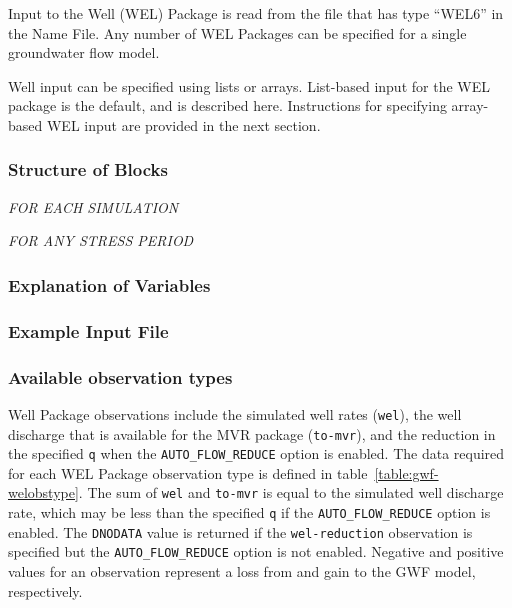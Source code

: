 Input to the Well (WEL) Package is read from the file that has type ``WEL6'' in the Name File.  Any number of WEL Packages can be specified for a single groundwater flow model.

Well input can be specified using lists or arrays.  List-based input for the WEL package is the default, and is described here.  Instructions for specifying array-based WEL input are provided in the next section.

\vspace{5mm}
\subsubsection{Structure of Blocks}
\vspace{5mm}

\noindent \textit{FOR EACH SIMULATION}


\vspace{5mm}
\noindent \textit{FOR ANY STRESS PERIOD}

\packageperioddescription

\vspace{5mm}
\subsubsection{Explanation of Variables}
\begin{description}

\end{description}

\vspace{5mm}
\subsubsection{Example Input File}


\vspace{5mm}
\subsubsection{Available observation types}
Well Package observations include the simulated well rates (\texttt{wel}), the well discharge that is available for the MVR package (\texttt{to-mvr}), and the reduction in the specified \texttt{q} when the \texttt{AUTO\_FLOW\_REDUCE} option is enabled. The data required for each WEL Package observation type is defined in table~\ref{table:gwf-welobstype}. The sum of \texttt{wel} and \texttt{to-mvr} is equal to the simulated well discharge rate, which may be less than the specified \texttt{q} if the \texttt{AUTO\_FLOW\_REDUCE} option is enabled. The \texttt{DNODATA} value is returned if the \texttt{wel-reduction} observation is specified but the \texttt{AUTO\_FLOW\_REDUCE} option is not enabled. Negative and positive values for an observation represent a loss from and gain to the GWF model, respectively.

